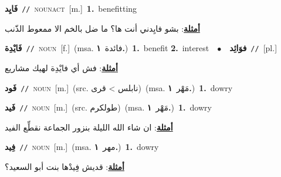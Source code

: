 \documentclass[10pt,a4paper,twoside]{article} %
\begin{document}
\begin{multicols}{2}
{\setlength\topsep{0pt}\textbf{\foreignlanguage{arabic}{فَايِد}}\ {\color{gray}\texttt{//}\color{black}}\ \textsc{noun\textunderscore act}\ [m.]\ \textbf{1.}~benefitting\  \begin{flushright}\color{gray}\foreignlanguage{arabic}{\textbf{\underline{\foreignlanguage{arabic}{أمثلة}}}: بشو فايِدني أنت ها؟ ما ضل بالخم الا ممعوط الذّنب}\end{flushright}\color{black}} \vspace{2mm}

{\setlength\topsep{0pt}\textbf{\foreignlanguage{arabic}{فَايْدِة}}\ {\color{gray}\texttt{//}\color{black}}\ \textsc{noun}\ [f.]\ \color{gray}(msa. \foreignlanguage{arabic}{فائدة}~\foreignlanguage{arabic}{\textbf{١.}})\color{black}\ \textbf{1.}~benefit  \textbf{2.}~interest\ \ $\bullet$\ \ \setlength\topsep{0pt}\textbf{\foreignlanguage{arabic}{فوَائِد}}\ {\color{gray}\texttt{//}\color{black}}\ [pl.]\  \begin{flushright}\color{gray}\foreignlanguage{arabic}{\textbf{\underline{\foreignlanguage{arabic}{أمثلة}}}: فش أي فايْدِة لهيك مشاريع}\end{flushright}\color{black}} \vspace{2mm}

{\setlength\topsep{0pt}\textbf{\foreignlanguage{arabic}{فَود}}\ {\color{gray}\texttt{//}\color{black}}\ \textsc{noun}\ [m.]\ (src. \color{gray}\foreignlanguage{arabic}{نابلس > قرى}\color{black})\ \color{gray}(msa. \foreignlanguage{arabic}{مَهْر}~\foreignlanguage{arabic}{\textbf{١.}})\color{black}\ \textbf{1.}~dowry\ } \vspace{2mm}

{\setlength\topsep{0pt}\textbf{\foreignlanguage{arabic}{فَيد}}\ {\color{gray}\texttt{//}\color{black}}\ \textsc{noun}\ [m.]\ (src. \color{gray}\foreignlanguage{arabic}{طولكرم}\color{black})\ \color{gray}(msa. \foreignlanguage{arabic}{مَهْر}~\foreignlanguage{arabic}{\textbf{١.}})\color{black}\ \textbf{1.}~dowry\  \begin{flushright}\color{gray}\foreignlanguage{arabic}{\textbf{\underline{\foreignlanguage{arabic}{أمثلة}}}: ان شاء الله الليلة بنزور الجماعة نقطِّع الفيد}\end{flushright}\color{black}} \vspace{2mm}

{\setlength\topsep{0pt}\textbf{\foreignlanguage{arabic}{فِيد}}\ {\color{gray}\texttt{//}\color{black}}\ \textsc{noun}\ [m.]\ \color{gray}(msa. \foreignlanguage{arabic}{مهر}~\foreignlanguage{arabic}{\textbf{١.}})\color{black}\ \textbf{1.}~dowry\  \begin{flushright}\color{gray}\foreignlanguage{arabic}{\textbf{\underline{\foreignlanguage{arabic}{أمثلة}}}: قديش فِيدْها بنت أبو السعيد؟}\end{flushright}\color{black}} \vspace{2mm}


\end{multicols}
\end{document}
